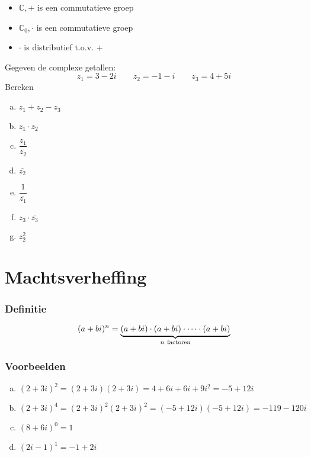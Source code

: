 \documentclass[12pt,twoside,a4paper]{article}
\begin{document}
\begin{itemize}
  \item $\mathbb{C},+$ is een commutatieve groep
  \item $\mathbb{C}_0,\cdot$ is een commutatieve groep
  \item $\cdot$ is distributief t.o.v. $+$
\end{itemize}

\begin{oefening}
  Gegeven de complexe getallen:
  $$z_1=3-2i \qquad z_2=-1-i \qquad z_3=4+5i$$
  Bereken
  \begin{multicols}{2}
    \begin{enumerate}[(a)]
      \itemsep 1em
    \item $\displaystyle z_1+z_2-z_3$
    \item $\displaystyle z_1\cdot z_2$
    \item $\displaystyle \dfrac{z_1}{z_2}$
    \item $\displaystyle \overline{z_2}$
    \item $\displaystyle \dfrac{1}{\overline{z_1}}$
    \item $\displaystyle z_3\cdot \overline{z_3}$
    \item $\displaystyle z_2^2$
    \end{enumerate}
  \end{multicols}
\end{oefening}

\pagebreak

\section{Machtsverheffing}

\subsubsection*{Definitie}
\begin{mdframed}
$$(a+bi)^n = \underbrace{(a+bi)\cdot(a+bi)\cdot\cdots\cdot(a+bi)}_{n\mbox{ \scriptsize factoren}}$$
\end{mdframed}

\subsubsection*{Voorbeelden}
\begin{enumerate}[(a)]
  \item $(2+3i)^2=(2+3i)(2+3i)=4+6i+6i+9i^2=-5+12i$
  \item $(2+3i)^4=(2+3i)^2(2+3i)^2=(-5+12i)(-5+12i)=-119-120i$
  \item $(8+6i)^0=1$
  \item $(2i-1)^1=-1+2i$
\end{enumerate}
\end{document}
